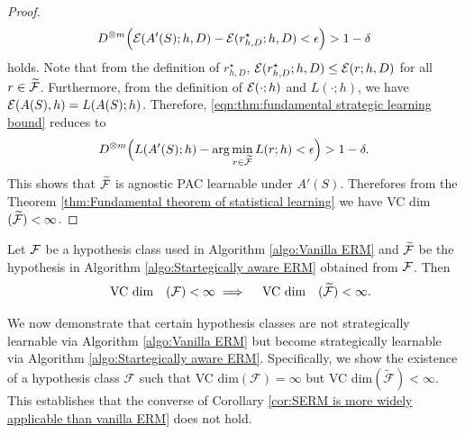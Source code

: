 \begin{proof}
\begin{equation}\label{eqn:thm:fundamental strategic learning bound}
D^{\otimes m}\Big( \mathcal{E}(A'(S); h, D) - \mathcal{E}(r^\star_{h, D}; h, D) < \epsilon \Big) > 1 - \delta
\end{equation}
holds.
Note that from the definition of $r^\star_{h,D}$, $\mathcal{E}(r^\star_{h,D};h,D) \leq \mathcal{E}(r;h,D)$ for all $r \in \widetilde{\mathcal{F}}$. Furthermore, from the definition of $\mathcal{E}(\cdot;h)$ and $L(\cdot;h)$, we have $\mathcal{E}(A(S),h) = L(A(S);h)$.
Therefore, \eqref{eqn:thm:fundamental strategic learning bound} reduces to 
\begin{equation}\label{eqn:them:fundamanetal strategic learning bound}
D^{\otimes m}\Big( L(A'(S);h) - \arg\min_{r \in \widetilde{\mathcal{F}}}L(r;h) < \epsilon \Big) > 1 - \delta.
\end{equation}
This shows that $\widetilde{\mathcal{F}}$ is agnostic PAC learnable under $A'(S)$. Therefores from the Theorem \ref{thm:Fundamental theorem of statistical learning} we have VC dim$(\widetilde{\mathcal{F}}) < \infty$.
\end{proof}

\begin{cor}\label{cor:SERM is more widely applicable than vanilla ERM}
	Let $\mathcal{F}$ be a hypothesis class used in Algorithm \ref{algo:Vanilla ERM} and $\widetilde{\mathcal{F}}$ be the hypothesis in Algorithm \ref{algo:Startegically aware ERM} obtained from $\mathcal{F}$. Then
	\[
		\hbox{\quad VC dim\quad}(\mathcal{F}) < \infty \implies \hbox{\quad VC dim\quad}(\widetilde{\mathcal{F}}) < \infty.
	\]
\end{cor}



We now demonstrate that certain hypothesis classes are not strategically learnable via Algorithm \ref{algo:Vanilla ERM} but become strategically learnable via Algorithm 
\ref{algo:Startegically aware ERM}.  Specifically, we show the existence of a hypothesis class $\mathcal{F}$ such that VC dim$(\mathcal{F}) = \infty$ but VC dim$(\tilde{\mathcal{F}}) < \infty$. This establishes that the converse of Corollary \ref{cor:SERM is more widely applicable than vanilla ERM} does not hold.

